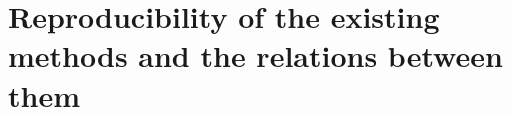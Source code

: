 \cleardoublepage
\part{Reproducibility of the existing methods and the relations between them}





\newpage

